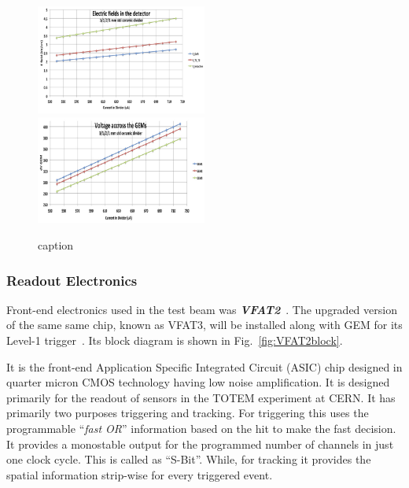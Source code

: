 \begin{figure}[htbp]
    \centering
    \includegraphics[width=0.5\textwidth]{figures/GEM/GE11_IV_ElectricField_detector.jpeg}%
    \includegraphics[width=0.5\textwidth]{figures/GEM/GE11_IV_VoltageAcross_GEM.jpeg}
    \caption{caption}
    \label{fig:GEM_voltage_electricfield}
\end{figure}

\subsubsection{Readout Electronics} %
\label{ssub:readout_electronics}
Front-end electronics used in the test beam was \textbf{\textit{VFAT2}}~\cite{Aspell2007,Berardi2004}.
The upgraded version of the same same chip, known as VFAT3, will be installed along with GEM for its Level-1 trigger~\cite{Licciulli2017}. Its block diagram is shown in Fig.~\ref{fig:VFAT2block}.

It is the front-end Application Specific Integrated Circuit (ASIC) chip designed in quarter micron CMOS technology having low noise amplification. It is designed primarily for the readout of sensors in the TOTEM experiment at CERN. 
It has primarily two purposes triggering and tracking. 
For triggering this uses the programmable ``\textit{fast OR}'' information based on the hit to make the fast decision. 
It provides a monostable output for the programmed number of channels in just one clock cycle. 
This is called as ``S-Bit''. While, for tracking it provides the spatial information strip-wise for every triggered event.

